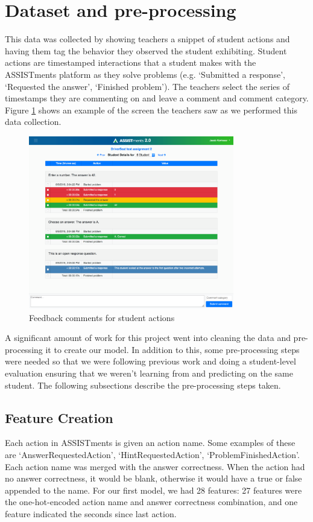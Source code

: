 \documentclass[12pt]{report}
\begin{document}
\section{Dataset and pre-processing}
This data was collected by showing teachers a snippet of student actions and having them tag the behavior they observed the student exhibiting. Student actions are timestamped interactions that a student makes with the ASSISTments platform as they solve problems (e.g. `Submitted a response', `Requested the answer', `Finished problem'). The teachers select the series of timestamps they are commenting on and leave a comment and comment category. Figure \ref{img:qc_action} shows an example of the screen the teachers saw as we performed this data collection. 

\begin{figure}[ht]
    \centering
    \includegraphics[width=0.8\textwidth]{images/qc_action.png}
    \caption{Feedback comments for student actions}
    \label{img:qc_action}
\end{figure}

A significant amount of work for this project went into cleaning the data and pre-processing it to create our model. In addition to this, some pre-processing steps were needed so that we were following previous work and doing a student-level evaluation ensuring that we weren't learning from and predicting on the same student. The following subsections describe the pre-processing steps taken.

\subsection{Feature Creation}
Each action in ASSISTments is given an action name. Some examples of these are `AnswerRequestedAction', `HintRequestedAction', `ProblemFinishedAction'. Each action name was merged with the answer correctness. When the action had no answer correctness, it would be blank, otherwise it would have a true or false appended to the name. For our first model, we had 28 features: 27 features were the one-hot-encoded action name and answer correctness combination, and one feature indicated the seconds since last action.
\end{document}
